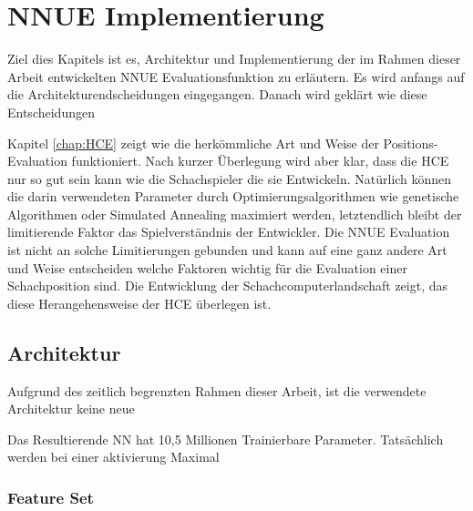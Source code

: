 \chapter{NNUE Implementierung}

Ziel dies Kapitels ist es, Architektur und Implementierung der im Rahmen dieser Arbeit entwickelten \ac{NNUE} Evaluationsfunktion zu erläutern. Es wird anfangs auf die Architekturendscheidungen eingegangen. Danach wird geklärt wie diese Entscheidungen 

Kapitel \autoref{chap:HCE} zeigt wie die herkömmliche Art und Weise der Positions-Evaluation funktioniert. Nach kurzer Überlegung wird aber klar, dass die \ac{HCE} nur so gut sein kann wie die Schachspieler die sie Entwickeln. Natürlich können die darin verwendeten Parameter durch Optimierungsalgorithmen wie genetische Algorithmen oder Simulated Annealing maximiert werden, letztendlich bleibt der limitierende Faktor das Spielverständnis der Entwickler. Die \ac{NNUE} Evaluation ist nicht an solche Limitierungen gebunden und kann auf eine ganz andere Art und Weise entscheiden welche Faktoren wichtig für die Evaluation einer Schachposition sind. Die Entwicklung der Schachcomputerlandschaft zeigt, das diese Herangehensweise der \ac{HCE} überlegen ist.


\section{Architektur}


Aufgrund des zeitlich begrenzten Rahmen dieser Arbeit, ist die verwendete Architektur keine neue 

Das Resultierende \ac{NN} hat 10,5 Millionen Trainierbare Parameter. Tatsächlich werden bei einer aktivierung Maximal 


\subsection{Feature Set}
\label{chap:featureSet}

